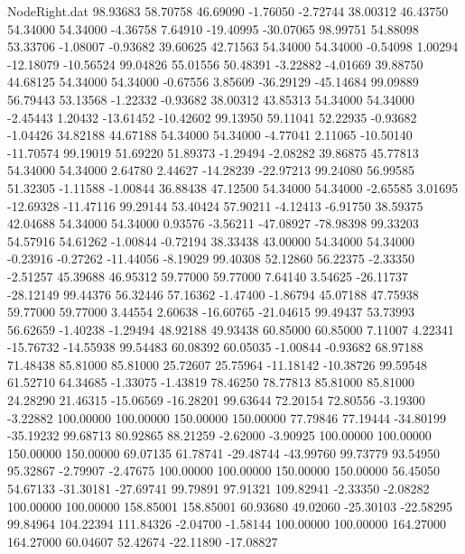 \begin{filecontents}{NodeRight.dat}
  98.93683   58.70758   46.69090    -1.76050   -2.72744   38.00312   46.43750   54.34000   54.34000   -4.36758    7.64910  -19.40995  -30.07065
  98.99751   54.88098   53.33706    -1.08007   -0.93682   39.60625   42.71563   54.34000   54.34000   -0.54098    1.00294  -12.18079  -10.56524
  99.04826   55.01556   50.48391    -3.22882   -4.01669   39.88750   44.68125   54.34000   54.34000   -0.67556    3.85609  -36.29129  -45.14684
  99.09889   56.79443   53.13568    -1.22332   -0.93682   38.00312   43.85313   54.34000   54.34000   -2.45443    1.20432  -13.61452  -10.42602
  99.13950   59.11041   52.22935    -0.93682   -1.04426   34.82188   44.67188   54.34000   54.34000   -4.77041    2.11065  -10.50140  -11.70574
  99.19019   51.69220   51.89373    -1.29494   -2.08282   39.86875   45.77813   54.34000   54.34000    2.64780    2.44627  -14.28239  -22.97213
  99.24080   56.99585   51.32305    -1.11588   -1.00844   36.88438   47.12500   54.34000   54.34000   -2.65585    3.01695  -12.69328  -11.47116
  99.29144   53.40424   57.90211    -4.12413   -6.91750   38.59375   42.04688   54.34000   54.34000    0.93576   -3.56211  -47.08927  -78.98398
  99.33203   54.57916   54.61262    -1.00844   -0.72194   38.33438   43.00000   54.34000   54.34000   -0.23916   -0.27262  -11.44056   -8.19029
  99.40308   52.12860   56.22375    -2.33350   -2.51257   45.39688   46.95312   59.77000   59.77000    7.64140    3.54625  -26.11737  -28.12149
  99.44376   56.32446   57.16362    -1.47400   -1.86794   45.07188   47.75938   59.77000   59.77000    3.44554    2.60638  -16.60765  -21.04615
  99.49437   53.73993   56.62659    -1.40238   -1.29494   48.92188   49.93438   60.85000   60.85000    7.11007    4.22341  -15.76732  -14.55938
  99.54483   60.08392   60.05035    -1.00844   -0.93682   68.97188   71.48438   85.81000   85.81000   25.72607   25.75964  -11.18142  -10.38726
  99.59548   61.52710   64.34685    -1.33075   -1.43819   78.46250   78.77813   85.81000   85.81000   24.28290   21.46315  -15.06569  -16.28201
  99.63644   72.20154   72.80556    -3.19300   -3.22882  100.00000  100.00000  150.00000  150.00000   77.79846   77.19444  -34.80199  -35.19232
  99.68713   80.92865   88.21259    -2.62000   -3.90925  100.00000  100.00000  150.00000  150.00000   69.07135   61.78741  -29.48744  -43.99760
  99.73779   93.54950   95.32867    -2.79907   -2.47675  100.00000  100.00000  150.00000  150.00000   56.45050   54.67133  -31.30181  -27.69741
  99.79891   97.91321  109.82941    -2.33350   -2.08282  100.00000  100.00000  158.85001  158.85001   60.93680   49.02060  -25.30103  -22.58295
  99.84964  104.22394  111.84326    -2.04700   -1.58144  100.00000  100.00000  164.27000  164.27000   60.04607   52.42674  -22.11890  -17.08827

\end{filecontents}
